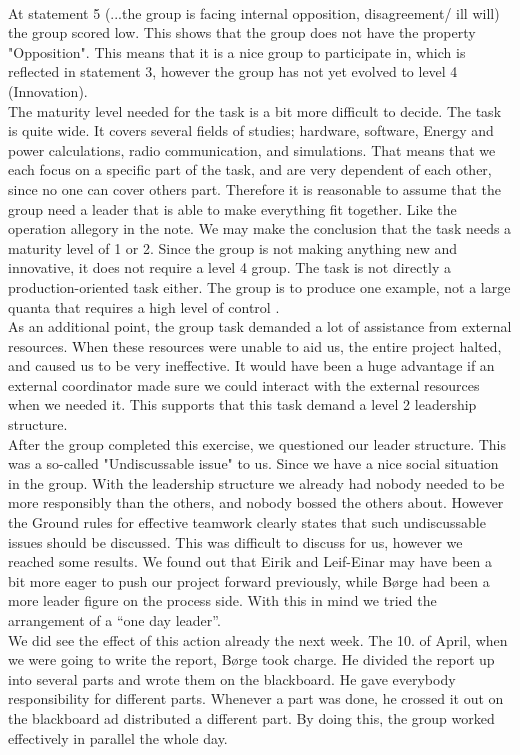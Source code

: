 \\
At statement 5 (...the group is facing internal opposition, disagreement/ ill will) the group scored low. This shows that the group does not have the property "Opposition". This means that it is a nice group to participate in, which is reflected in statement 3, however the group has not yet evolved to level 4 (Innovation)\cite{Maturity}.
\\ 
The maturity level needed for the task is a bit more difficult to decide. The task is quite wide. It covers several fields of studies; hardware, software, Energy and power calculations, radio communication, and simulations. That means that we each focus on a specific part of the task, and are very dependent of each other, since no one can cover others part. Therefore it is reasonable to assume that the group need a leader that is able to make everything fit together. Like the operation allegory in the note. We may make the conclusion that the task needs a maturity level of 1 or 2. Since the group is not making anything new and innovative, it does not require a level 4 group. The task is not directly a production-oriented task either. The group is to produce one example, not a large quanta that requires a high level of control \cite{Maturity}.
\\
As an additional point, the group task demanded a lot of assistance from external resources. When these resources were unable to aid us, the entire project halted, and caused us to be very ineffective. It would have been a huge advantage if an external coordinator made sure we could interact with the external resources when we needed it. This supports that this task demand a level 2 leadership structure.
\\
After the group completed this exercise, we questioned our leader structure. This was a so-called "Undiscussable issue" to us. Since we have a nice social situation in the group. With the leadership structure we already had nobody needed to be more responsibly than the others, and nobody bossed the others about. However the Ground rules for effective teamwork clearly states that such undiscussable issues should be discussed\cite{EffectiveGroups}. This was difficult to discuss for us, however we reached some results. We found out that Eirik and Leif-Einar may have been a bit more eager to push our project forward previously, while Børge had been a more leader figure on the process side. With this in mind we tried the arrangement of a “one day leader”. 
\\
We did see the effect of this action already the next week. The 10. of April, when we were going to write the report, Børge took charge. He divided the report up into several parts and wrote them on the blackboard. He gave everybody responsibility for different parts. Whenever a part was done, he crossed it out on the blackboard ad distributed a different part. By doing this, the group worked effectively in parallel the whole day. 
